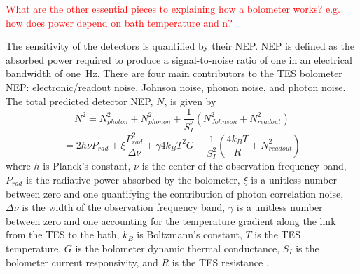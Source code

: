 
\textcolor{red}{What are the other essential pieces to explaining how a bolometer works?
e.g. how does power depend on bath temperature and n?
}




The sensitivity of the detectors is quantified by their \ac{NEP}. 
\ac{NEP} is defined as the absorbed power required to produce a signal-to-noise ratio of one in an electrical bandwidth of one~Hz. 
There are four main contributors to the \ac{TES} bolometer \ac{NEP}: electronic/readout noise, Johnson noise, phonon noise, and photon noise. 
The total predicted detector \ac{NEP}, $N$, is given by 
\begin{equation}
N^{2} = N_{photon}^2 + N_{phonon}^2 + \frac{1}{S_I^2} ( N_{Johnson}^2 + N_{readout}^2 )
\end{equation}
\begin{equation}
= 2h\nu P_{rad} + \xi \frac{P_{rad}^2}{\Delta \nu} + \gamma 4k_{B} T^2 G + \frac{1}{S_I^2} (\frac{4k_{B}T}{R} + N_{readout}^2 )
\label{eq:nep}
\end{equation}
where $h$ is Planck's constant, $\nu$ is the center of the observation frequency band, $P_{rad}$ is the radiative power absorbed by the bolometer, $\xi$ is a unitless number between zero and one quantifying the contribution of photon correlation noise, $\Delta \nu$ is the width of the observation frequency band, $\gamma$ is a unitless number between zero and one accounting for the temperature gradient along the link from the \ac{TES} to the bath, $k_{B}$ is Boltzmann's constant, $T$ is the \ac{TES} temperature, $G$ is the bolometer dynamic thermal conductance, $S_{I}$ is the bolometer current responsivity, and $R$ is the \ac{TES} resistance \cite{Mather1982}. 


